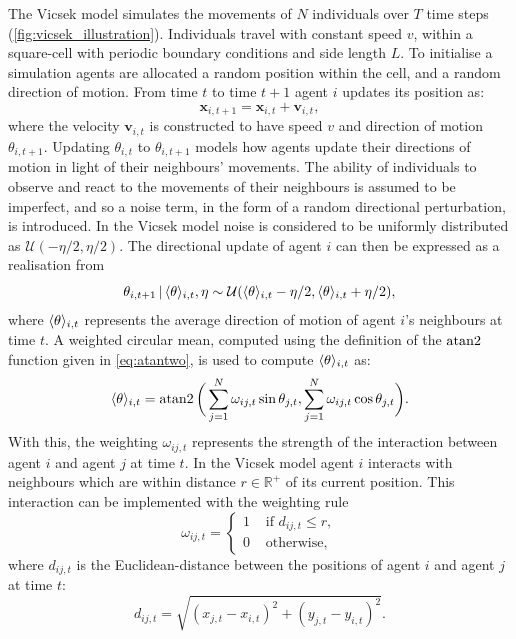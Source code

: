 The Vicsek model simulates the movements of $N$ individuals over $T$ time steps
(\cref{fig:vicsek_illustration}). Individuals travel with constant speed $v$,
within a square-cell with periodic boundary conditions and side length $L$. To
initialise a simulation agents are allocated a random position within the cell,
and a random direction of motion. From time $t$ to time $t+1$ agent $i$ updates
its position as:
\begin{equation}
  \label{eq:positional_update}
  \bm{x}_{i, t+1} = \bm{x}_{i, t} + \bm{v}_{i, t},
\end{equation}
where the velocity $\bm{v}_{i,t}$ is constructed to have speed $v$ and
direction of motion $\theta_{i, t+1}$. Updating $\theta_{i,t}$ to $\theta_{i,
t+1}$ models how agents update their directions of motion in light of their
neighbours' movements. The ability of individuals to observe and react to the
movements of their neighbours is assumed to be imperfect, and so a noise term,
in the form of a random directional perturbation, is introduced. In the Vicsek
model noise is considered to be uniformly distributed as $\mathcal{U}(-\eta/2,
\eta/2)$. The directional update of agent $i$ can then be expressed as a
realisation from
\begin{equation}
  \label{eq:vicsek_update}
  \theta_{i, t+1} \,|\, \langle\theta\rangle_{i, t}, \eta \sim
                 \mathcal{U}(\langle\theta\rangle_{i, t} - \eta/2,
                             \langle\theta\rangle_{i, t} + \eta/2),
\end{equation}
where $\langle\theta\rangle_{i, t}$ represents the average direction of motion of
agent $i$'s neighbours at time $t$. A weighted circular mean, computed using
the definition of the $\operatorname{atan2}$ function given in \cref{eq:atantwo}, is used
to compute $\langle\theta\rangle_{i, t}$ as:
\begin{equation}
  \label{eq:weighted_interaction}
  \langle\theta\rangle_{i, t} = \operatorname{atan2}\bigg(
      \sum_{j=1}^N \omega_{ij, t} \sin\theta_{j,t},
      \sum_{j=1}^N \omega_{ij, t} \cos\theta_{j,t}
  \bigg).
\end{equation}
With this, the weighting $\omega_{ij, t}$ represents the strength of the
interaction between agent $i$ and agent $j$ at time $t$. In the Vicsek model
agent $i$ interacts with neighbours which are within distance
$r\in\mathbb{R}^+$ of its current position. This interaction can be implemented
with the weighting rule
\begin{equation}
  \label{eq:vicsek_interaction}
  \omega_{ij,t} =
  \begin{cases}
    1 & \text{ if } d_{ij, t} \leq r,\\
    0 & \text{ otherwise,}
  \end{cases}
\end{equation}
where $d_{ij,t}$ is the Euclidean-distance between the positions of agent $i$
and agent $j$ at time $t$:
\begin{equation*}
  d_{ij,t} = \sqrt{(x_{j,t} - x_{i,t})^2 + (y_{j,t} - y_{i,t})^2}.
\end{equation*}

